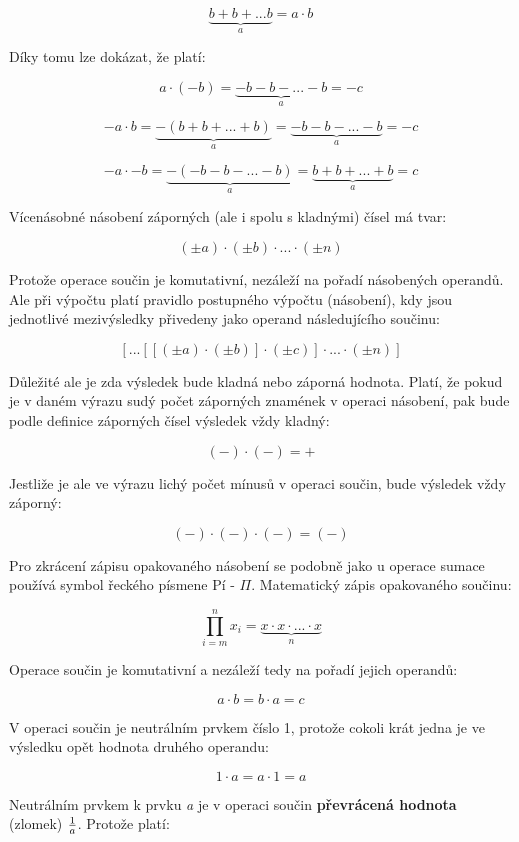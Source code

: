 $$ \underbrace {b + b + ... b }_a = a \cdot b  $$

Díky tomu lze dokázat, že platí:

$$ a \cdot (-b) = \underbrace {-b -b - ... -b}_a = -c $$

$$ -a \cdot b = \underbrace{-(b + b + ... +b)}_a = \underbrace {-b -b - ... -b }_a = -c $$

$$-a \cdot -b = \underbrace{-(-b-b-...-b)}_a = \underbrace {b+b+...+b}_a = c$$


Vícenásobné násobení záporných (ale i spolu s kladnými) čísel má tvar:

$$ (\pm a) \cdot (\pm b) \cdot ... \cdot (\pm n) $$

Protože operace součin je komutativní, nezáleží na pořadí násobených operandů. Ale při výpočtu platí pravidlo postupného výpočtu (násobení), kdy jsou jednotlivé mezivýsledky přivedeny jako operand následujícího součinu:

$$[...[[(\pm a) \cdot (\pm b)] \cdot (\pm c)] \cdot ...\cdot (\pm n)]$$

Důležité ale je zda výsledek bude kladná nebo záporná hodnota. Platí, že pokud je v daném výrazu sudý počet záporných znamének v operaci násobení, pak bude podle definice záporných čísel výsledek vždy kladný:

$$ (-) \cdot (-) = + $$

Jestliže je ale ve výrazu lichý počet mínusů v operaci součin, bude výsledek vždy záporný:

$$ (-) \cdot (-) \cdot (- ) = (-)$$


Pro zkrácení zápisu opakovaného násobení se podobně jako u operace sumace používá symbol řeckého písmene Pí - $\Pi$. Matematický zápis opakovaného součinu:

$$\prod_{i=m}^n x_i = \underbrace{x \cdot x \cdot ... \cdot x}_n $$


Operace součin je komutativní a nezáleží tedy na pořadí jejich operandů:

$$ a \cdot b = b \cdot a = c $$

V operaci součin je neutrálním prvkem číslo 1, protože cokoli krát jedna je ve výsledku opět hodnota druhého operandu:

$$ 1 \cdot a = a \cdot 1 = a $$

Neutrálním prvkem k prvku {\it a} je v operaci součin {\bf převrácená hodnota} (zlomek) $1\over a$. Protože platí:

